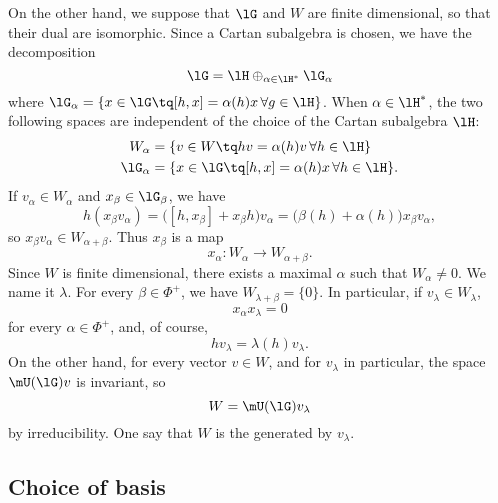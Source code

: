 On the other hand, we suppose that $\lG$ and $W$ are finite dimensional, so that their dual are isomorphic. Since a Cartan subalgebra is chosen, we have the decomposition
\begin{equation}
	\lG=\lH\oplus_{\alpha\in\lH^*}\lG_{\alpha}
\end{equation}
where $\lG_{\alpha}=\{ x\in\lG\tq [h,x]=\alpha(h)x\,\forall g\in\lH \}$. When $\alpha\in\lH^*$, the two following spaces are independent of the choice of the Cartan subalgebra $\lH$:
\begin{equation}
	\begin{aligned}
		W_{\alpha}   & =\{ v\in W \tq hv=\alpha(h)v\,\forall h\in\lH \}         \\
		\lG_{\alpha} & =\{ x\in\lG    \tq [h,x]=\alpha(h)x\,\forall h\in\lH \}.
	\end{aligned}
\end{equation}
If $v_{\alpha}\in W_{\alpha}$ and $x_{\beta}\in\lG_{\beta}$, we have
\begin{equation}
	h(x_{\beta}v_{\alpha})=\big( [h,x_{\beta}]+x_{\beta}h \big)v_{\alpha}=\big( \beta(h)+\alpha(h) \big)x_{\beta} v_{\alpha},
\end{equation}
so $x_{\beta}v_{\alpha}\in W_{\alpha+\beta}$. Thus $x_{\beta}$ is a map
\begin{equation}
	x_{\alpha}\colon W_{\alpha}\to W_{\alpha+\beta}.
\end{equation}
Since $W$ is finite dimensional, there exists a maximal $\alpha$ such that $W_{\alpha}\neq0$. We name it $\lambda$. For every $\beta\in\Phi^+$, we have $W_{\lambda+\beta}=\{ 0 \}$. In particular, if $v_{\lambda}\in W_{\lambda}$,
\begin{equation}
	x_{\alpha}x_{\lambda}=0
\end{equation}
for every $\alpha\in\Phi^+$, and, of course,
\begin{equation}
	hv_{\lambda}=\lambda(h)v_{\lambda}.
\end{equation}
On the other hand, for every vector $v\in W$, and for $v_{\lambda}$ in particular, the space $\mU(\lG)v$ is invariant, so
\begin{equation}
	W=\mU(\lG)v_{\lambda}
\end{equation}
by irreducibility. One say that $W$ is the  generated by $v_{\lambda}$.


\subsection{Choice of basis}



